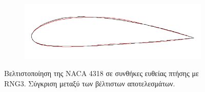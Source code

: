 \documentclass[twoside, 12pt,notitlepage]{report}
\begin{document}
\begin{enumerate}
\begin{figure}[h!]
\begin{subfigure}[b]{0.44\textwidth}
	\includegraphics[width=\textwidth, scale=1]{cruise_EAs}   
	\end{subfigure}
\caption{Βελτιστοποίηση της NACA 4318 σε συνθήκες ευθείας πτήσης με 
RNG3. Σύγκριση μεταξύ των βέλτιστων αποτελεσμάτων.} 
\end{figure}

\end{enumerate}

\vspace{-4mm}
\end{document}
